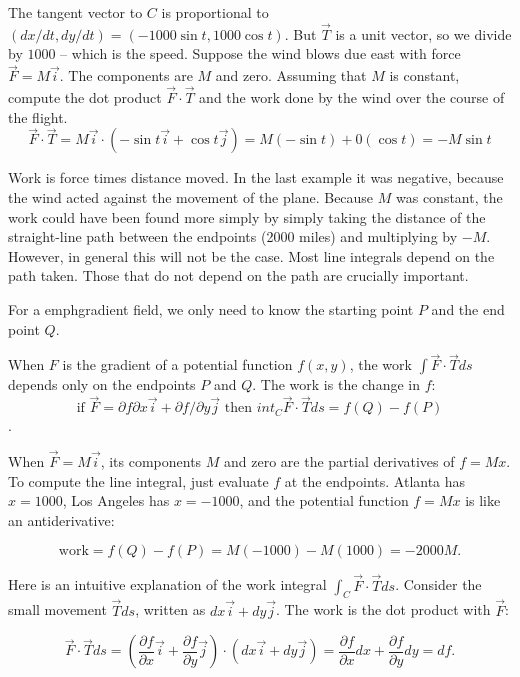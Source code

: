 The tangent vector to $C$ is proportional to $(dx/dt, dy/dt) = (-1000 \sin t, 1000 \cos t)$.
But $\vec T$ is a unit vector, so we divide by $1000$ -- which is the speed.
{
Suppose the wind blows due east with force $\vec F = M\vec i$. The components are $M$ and
zero. Assuming that $M$ is constant, compute the dot product $\vec F \cdot \vec T$ and the work done by the wind over the course of the flight.}
{
$$\vec F \cdot \vec T= M\vec i \cdot(-\sin t \vec i+\cos t \vec j)= M(-\sin t)+0(\cos t)= -M \sin t$$ 
}

Work is force times distance moved. In the last example it was negative, because the wind acted against the movement of the plane. Because $M$ was constant, the work could have been found more simply by simply taking the distance of the straight-line path between the endpoints
 (2000 miles) and multiplying by $- M$. However, in general this will not be the case.
Most line integrals depend on the path taken. Those that do not depend on the path are crucially important.

For a emph{gradient field}, we only need to know the starting point $P$ and the end point $Q$.

{
When $F$ is the gradient of a potential function $f (x, y)$, the work $\int \vec F \cdot \vec T ds$ depends only on the endpoints $P$ and $Q$. The work is the change in $f$:
$$\text{if } \vec F = \partial f \partial x \vec i + \partial f/\partial y \vec j \text{ then } int_C \vec F \cdot \vec T ds = f (Q) - f(P)$$.
}

When $\vec F = M \vec i$, its components $M$ and zero are the partial derivatives of $f = Mx$. To
compute the line integral, just evaluate $f$ at the endpoints. Atlanta has $x = 1000$, Los
Angeles has $x = - 1000$, and the potential function $f = Mx$ is like an antiderivative:

$$\text{work} = f (Q) - f (P) = M(- 1000) - M(1000) = - 2000M.$$


Here is an intuitive explanation of the work integral $\int_C \vec F \cdot \vec T ds$. Consider the small movement $\vec T ds$, written as $dx \vec i + dy \vec j$. The work is the dot product
with $\vec F$:

$$\vec F \cdot \vec T ds=\left(\dfrac{\partial f}{\partial x}\vec i + \dfrac{\partial f}{\partial y}\vec j \right)\cdot \left(dx \vec i +dy \vec j \right)=\dfrac{\partial f}{\partial x}dx+\dfrac{\partial f}{\partial y}dy=df.$$

